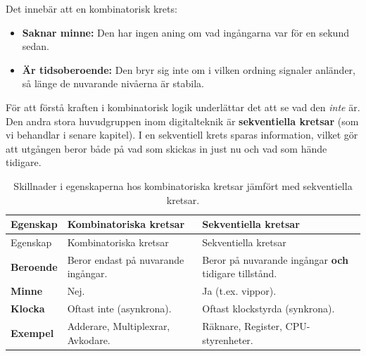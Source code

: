 \documentclass[
  swedish,
  letterpaper,
  oneside,
  openany]{book}
\providecommand{\tightlist}{%
  \setlength{\itemsep}{0pt}\setlength{\parskip}{0pt}}
\begin{document}
Det innebär att en kombinatorisk krets:

\begin{itemize}
\tightlist
\item
  \textbf{Saknar minne:} Den har ingen aning om vad ingångarna var för
  en sekund sedan.
\item
  \textbf{Är tidsoberoende:} Den bryr sig inte om i vilken ordning
  signaler anländer, så länge de nuvarande nivåerna är stabila.
\end{itemize}

För att förstå kraften i kombinatorisk logik underlättar det att se vad
den \emph{inte} är. Den andra stora huvudgruppen inom digitalteknik är
\textbf{sekventiella kretsar} (som vi behandlar i senare kapitel). I en
sekventiell krets sparas information, vilket gör att utgången beror både
på vad som skickas in just nu och vad som hände tidigare.

\begin{longtable}[]{@{}
  >{\raggedright\arraybackslash}p{}
  >{\raggedright\arraybackslash}p{}
  >{\raggedright\arraybackslash}p{}@{}}
\caption{Skillnader i egenskaperna hos kombinatoriska kretsar jämfört
med sekventiella
kretsar.}\label{tbl-kombinatoriska_sekventiella}\tabularnewline
\toprule\noalign{}
\begin{minipage}[b]{\linewidth}\raggedright
Egenskap
\end{minipage} & \begin{minipage}[b]{\linewidth}\raggedright
Kombinatoriska kretsar
\end{minipage} & \begin{minipage}[b]{\linewidth}\raggedright
Sekventiella kretsar
\end{minipage} \\
\midrule\noalign{}
\endfirsthead
\toprule\noalign{}
\begin{minipage}[b]{\linewidth}\raggedright
Egenskap
\end{minipage} & \begin{minipage}[b]{\linewidth}\raggedright
Kombinatoriska kretsar
\end{minipage} & \begin{minipage}[b]{\linewidth}\raggedright
Sekventiella kretsar
\end{minipage} \\
\midrule\noalign{}
\endhead
\bottomrule\noalign{}
\endlastfoot
\textbf{Beroende} & Beror endast på nuvarande ingångar. & Beror på
nuvarande ingångar \textbf{och} tidigare tillstånd. \\
\textbf{Minne} & Nej. & Ja (t.ex. vippor). \\
\textbf{Klocka} & Oftast inte (asynkrona). & Oftast klockstyrda
(synkrona). \\
\textbf{Exempel} & Adderare, Multiplexrar, Avkodare. & Räknare,
Register, CPU-styrenheter. \\
\end{longtable}
\end{document}
